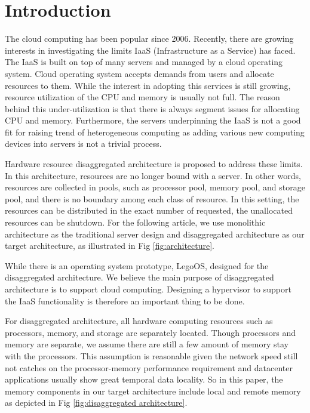 \documentclass[twocolumn]{article}
\begin{document}
\section{Introduction}

The cloud computing has been popular since 2006. Recently, there are growing interests in investigating the limits IaaS (Infrastructure as a Service) has faced. The IaaS is built on top of many servers and managed by a cloud operating system.  Cloud operating system accepts demands from users and allocate resources to them. While the interest in adopting this services is still growing, resource utilization of the CPU and memory is usually not full. The reason behind this under-utilization is that there is always segment issues for allocating CPU and memory. Furthermore, the servers underpinning the IaaS is not a good fit for raising trend of heterogeneous computing as adding various new computing devices into servers is not a trivial process.

Hardware resource disaggregated architecture is proposed to address these limits. In this architecture, resources are no longer bound with a server. In other words, resources are collected in pools, such as processor pool, memory pool, and storage pool, and there is no boundary among each class of resource. In this setting, the resources can be distributed in the exact number of requested, the unallocated resources can be shutdown. For the following article, we use monolithic architecture as the traditional server design and disaggregated architecture as our target architecture, as illustrated in Fig \ref{fig:architecture}.

While there is an operating system prototype, LegoOS\cite{LegoOS}, designed for the disaggregated architecture. We believe the main purpose of disaggregated architecture is to support cloud computing. Designing a hypervisor to support the IaaS functionality is therefore an important thing to be done.

For disaggregated architecture, all hardware computing resources such as processors, memory, and storage are separately located. Though processors and memory are separate, we assume there are still a few amount of memory stay with the processors. This assumption is reasonable given the network speed still not catches on the processor-memory performance requirement\cite{Network_requirement} and datacenter applications usually show great temporal data locality\cite{NN_load,MapReduce_load}. So in this paper, the memory components in our target architecture include local and remote memory as depicted in Fig \ref{fig:disaggregated architecture}.
\end{document}

